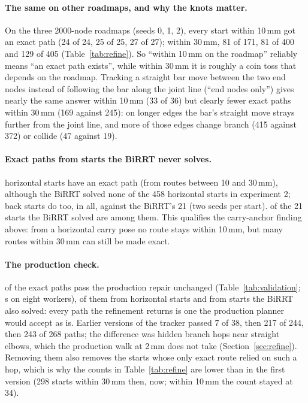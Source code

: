 \paragraph{The same on other roadmaps, and why the knots matter.} On the three
2000-node roadmaps (seeds 0, 1, 2), every start within 10\,mm got an exact path (24 of
24, 25 of 25, 27 of 27); within 30\,mm, 81 of 171, 81 of 400 and 129 of 405
(Table~\ref{tab:refine}). So ``within 10\,mm on the roadmap'' reliably means ``an exact
path exists'', while within 30\,mm it is roughly a coin toss that depends on the
roadmap. Tracking a straight bar move between the two end nodes instead of following
the bar along the joint line (``end nodes only'') gives nearly the same answer within
10\,mm (33 of 36) but clearly fewer exact paths within 30\,mm (169 against 245): on
longer edges the bar's straight move strays further from the joint line, and more of
those edges change branch (415 against 372) or collide (47 against 19).

\paragraph{Exact paths from starts the BiRRT never solves.} \PrmExactHorizontal{}
horizontal starts have an exact path (from routes between 10 and 30\,mm), although the
BiRRT solved none of the 458 horizontal starts in experiment 2; \PrmExactBack{} back
starts do too, \PrmExactThirty{} in all, against the BiRRT's 21 (two seeds per
start). \PrmExactBirrtOverlap{} of the 21 starts the BiRRT
solved are among them. This qualifies the carry-anchor finding above: from a
horizontal carry pose no route stays within 10\,mm, but many routes within 30\,mm can
still be made exact.

\begin{table}[h]
\centering
\footnotesize
\caption{The production check of every stored exact path of the 4000-node refinement:
the production repair () re-solves each path at 2\,mm and
0.002\,rad bar steps with the production solver, gate and collision check.}
\label{tab:validation}

\end{table}

\paragraph{The production check.} \PrmCheckPassed{} of the \PrmCheckPaths{} exact paths
pass the production repair unchanged (Table~\ref{tab:validation}; \PrmCheckSeconds\,s on
eight workers), \PrmCheckPassedHorizontal{} of them from horizontal starts and
\PrmCheckPassedBirrt{} from starts the BiRRT also solved: every path the refinement
returns is one the production planner would accept as is. Earlier versions of the
tracker passed 7 of 38, then 217 of 244, then 243 of 268 paths; the difference was
hidden branch hops near straight elbows, which the production walk at 2\,mm does not take
(Section~\ref{sec:refine}). Removing them also removes the starts whose only exact
route relied on such a hop, which is why the counts in Table~\ref{tab:refine} are
lower than in the first version (298 starts within 30\,mm then, \PrmExactThirty{} now;
within 10\,mm the count stayed at 34).

